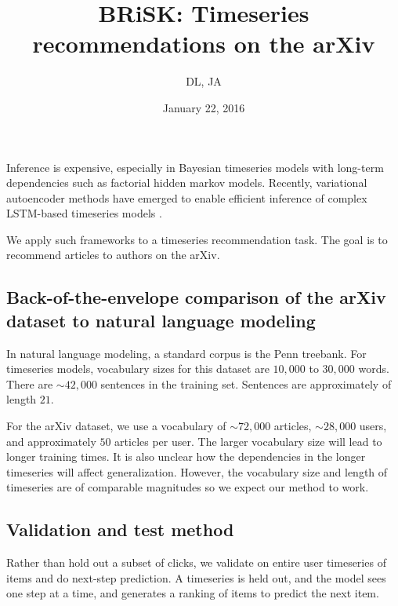 




\title{BRiSK: Timeseries recommendations on the arXiv}
\author{DL, JA}
\date{January 22, 2016}


\maketitle

Inference is expensive, especially in Bayesian timeseries models with long-term dependencies such as factorial hidden markov models. Recently, variational autoencoder methods \citep{Kingma2014} have emerged to enable efficient inference of complex LSTM-based timeseries models \citep{Bowman2015a}.

We apply such frameworks to a timeseries recommendation task. The goal is to recommend articles to authors on the arXiv.

\subsection*{Back-of-the-envelope comparison of the arXiv dataset to natural language modeling}

In natural language modeling, a standard corpus is the Penn treebank. For timeseries models, vocabulary sizes for this dataset are $10,000$ to $30,000$ words. There are $\sim42,000$ sentences in the training set. Sentences are approximately of length $21$.

For the arXiv dataset, we use a vocabulary of $\sim72,000$ articles, $\sim 28,000$ users, and approximately $50$ articles per user. The larger vocabulary size will lead to longer training times. It is also unclear how the dependencies in the longer timeseries will affect generalization. However, the vocabulary size and length of timeseries are of comparable magnitudes so we expect our method to work.

\subsection*{Validation and test method}
Rather than hold out a subset of clicks, we validate on entire user timeseries of items and do next-step prediction. A timeseries is held out, and the model sees one step at a time, and generates a ranking of items to predict the next item.

